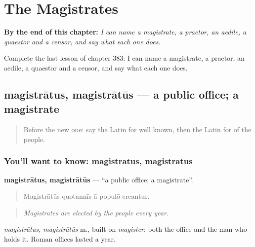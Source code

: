 
\chapter{The Magistrates}
\label{ch:la-the-magistrates}

\begin{chapteropening}
\textbf{By the end of this chapter:} \emph{I can name a magistrate, a praetor, an aedile, a quaestor and a censor, and say what each one does.}

Complete the last lesson of chapter 383: I can name a magistrate, a praetor, an aedile, a quaestor and a censor, and say what each one does.
\end{chapteropening}

\section[magistrātus, magistrātūs]{magistrātus, magistrātūs — a public office; a magistrate}

\label{lesson:LA-C383-magistratus}



\begin{quote}
Before the new one: say the Latin for well known, then the Latin for of the people.
\end{quote}

\subsection*{You'll want to know: magistrātus, magistrātūs}
\textbf{magistrātus, magistrātūs} — \textquotedblleft{}a public office; a magistrate\textquotedblright{}.

\begin{quote}
Magistrātūs quotannīs ā populō creantur.
\end{quote}

\begin{quote}
\emph{Magistrates are elected by the people every year.}
\end{quote}

\emph{magistrātus, magistrātūs} m., built on \emph{magister}: both the office and the man who holds it. Roman offices lasted a year.

